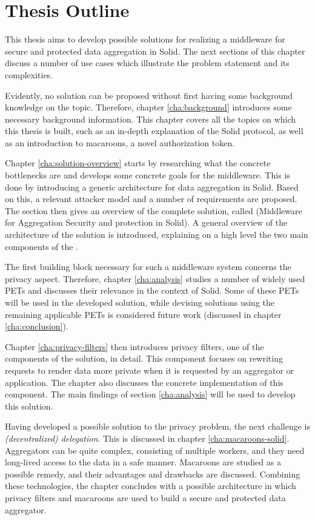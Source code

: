\section{Thesis Outline}
\label{sec:outline}
This thesis aims to develop possible solutions for realizing a middleware for secure and protected data aggregation in Solid. The next sections of this chapter discuss a number of use cases which illustrate the problem statement and its complexities.

Evidently, no solution can be proposed without first having some background knowledge on the topic. Therefore, chapter \ref{cha:background} introduces some necessary background information. This chapter covers all the topics on which this thesis is built, such as an in-depth explanation of the Solid protocol, as well as an introduction to macaroons, a novel authorization token. 

Chapter \ref{cha:solution-overview} starts by researching what the concrete bottlenecks are and develops some concrete goals for the middleware. This is done by introducing a generic architecture for data aggregation in Solid. Based on this, a relevant attacker model and a number of requirements are proposed. The section then gives an overview of the complete solution, called \middleware{} (Middleware for Aggregation Security and protection in Solid). A general overview of the architecture of the solution is introduced, explaining on a high level the two main components of the \middleware{}.

The first building block necessary for such a middleware system concerns the privacy aspect. Therefore, chapter \ref{cha:analysis} studies a number of widely used \acrlong{PETs} and discusses their relevance in the context of Solid. Some of these \acrshort{PETs} will be used in the developed solution, while devising solutions using the remaining applicable \acrshort{PETs} is considered future work (discussed in chapter \ref{cha:conclusion}).

Chapter \ref{cha:privacy-filters} then introduces privacy filters, one of the components of the solution, in detail. This component focuses on rewriting requests to render data more private when it is requested by an aggregator or application. The chapter also discusses the concrete implementation of this component. The main findings of section \ref{cha:analysis} will be used to develop this solution.

Having developed a possible solution to the privacy problem, the next challenge is \textit{(decentralized) delegation}. This is discussed in chapter \ref{cha:macaroons-solid}. Aggregators can be quite complex, consisting of multiple workers, and they need long-lived access to the data in a safe manner. Macaroons are studied as a possible remedy, and their advantages and drawbacks are discussed. Combining these technologies, the chapter concludes with a possible architecture in which privacy filters and macaroons are used to build a secure and protected data aggregator.

